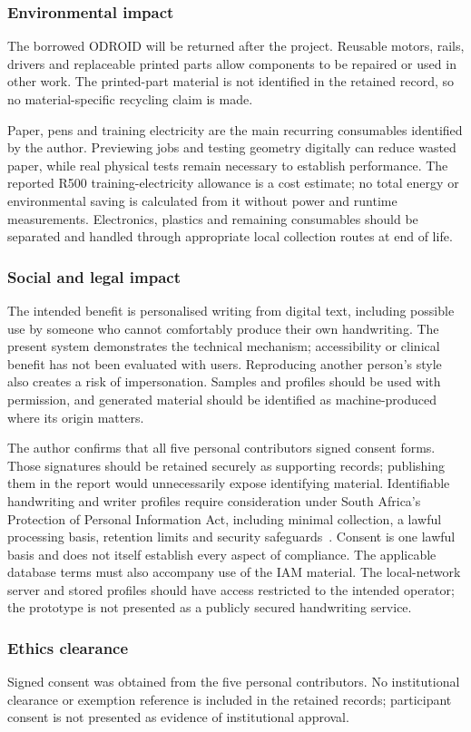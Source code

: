 \subsubsection{Environmental impact}
The borrowed ODROID will be returned after the project. Reusable motors, rails, drivers and replaceable printed parts allow components to be repaired or used in other work. The printed-part material is not identified in the retained record, so no material-specific recycling claim is made.

Paper, pens and training electricity are the main recurring consumables identified by the author. Previewing jobs and testing geometry digitally can reduce wasted paper, while real physical tests remain necessary to establish performance. The reported R500 training-electricity allowance is a cost estimate; no total energy or environmental saving is calculated from it without power and runtime measurements. Electronics, plastics and remaining consumables should be separated and handled through appropriate local collection routes at end of life.

\subsubsection{Social and legal impact}
The intended benefit is personalised writing from digital text, including possible use by someone who cannot comfortably produce their own handwriting. The present system demonstrates the technical mechanism; accessibility or clinical benefit has not been evaluated with users. Reproducing another person's style also creates a risk of impersonation. Samples and profiles should be used with permission, and generated material should be identified as machine-produced where its origin matters.

The author confirms that all five personal contributors signed consent forms. Those signatures should be retained securely as supporting records; publishing them in the report would unnecessarily expose identifying material. Identifiable handwriting and writer profiles require consideration under South Africa's Protection of Personal Information Act, including minimal collection, a lawful processing basis, retention limits and security safeguards~\cite[pp.~8--9, 11]{popia2013}. Consent is one lawful basis and does not itself establish every aspect of compliance. The applicable database terms must also accompany use of the IAM material. The local-network server and stored profiles should have access restricted to the intended operator; the prototype is not presented as a publicly secured handwriting service.

\subsubsection{Ethics clearance}
Signed consent was obtained from the five personal contributors. No institutional clearance or exemption reference is included in the retained records; participant consent is not presented as evidence of institutional approval.
\FloatBarrier

